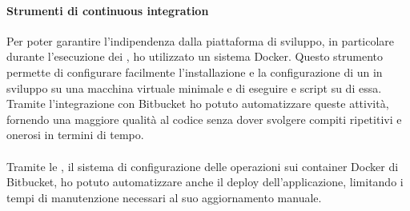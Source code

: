 		\paragraph{Strumenti di continuous integration}
		Per poter garantire l'indipendenza dalla piattaforma di sviluppo, in particolare durante l'esecuzione dei , ho utilizzato un sistema \gls{Docker}. Questo strumento permette di configurare facilmente l'installazione e la configurazione di un  in sviluppo su una macchina virtuale minimale e di eseguire  e script su di essa. Tramite l'integrazione con Bitbucket ho potuto automatizzare queste attività, fornendo una maggiore qualità al codice senza dover svolgere compiti ripetitivi e onerosi in termini di tempo.
		\paragraph*{}
		Tramite le , il sistema di configurazione delle operazioni sui container \gls{Docker} di Bitbucket, ho potuto automatizzare anche il deploy dell'applicazione, limitando i tempi di manutenzione necessari al suo aggiornamento manuale.

